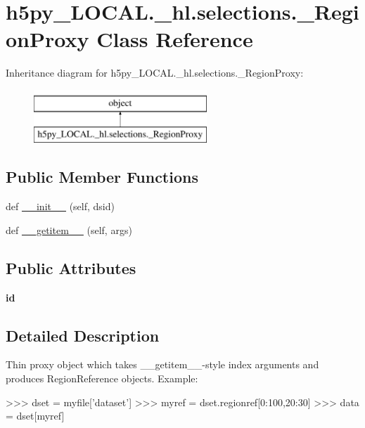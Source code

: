 \hypertarget{classh5py__LOCAL_1_1__hl_1_1selections_1_1__RegionProxy}{}\section{h5py\+\_\+\+L\+O\+C\+A\+L.\+\_\+hl.\+selections.\+\_\+\+Region\+Proxy Class Reference}
\label{classh5py__LOCAL_1_1__hl_1_1selections_1_1__RegionProxy}
Inheritance diagram for h5py\+\_\+\+L\+O\+C\+A\+L.\+\_\+hl.\+selections.\+\_\+\+Region\+Proxy\+:\begin{figure}[H]
\begin{center}
\leavevmode
\includegraphics[height=2.000000cm]{classh5py__LOCAL_1_1__hl_1_1selections_1_1__RegionProxy}
\end{center}
\end{figure}
\subsection*{Public Member Functions}
\begin{DoxyCompactItemize}
\item 
def \hyperlink{classh5py__LOCAL_1_1__hl_1_1selections_1_1__RegionProxy_a2c2d27cfe6e1822817d762e5f8d91279}{\+\_\+\+\_\+init\+\_\+\+\_\+} (self, dsid)
\item 
def \hyperlink{classh5py__LOCAL_1_1__hl_1_1selections_1_1__RegionProxy_a3ea41f12f66ca405ef99bcfec7d1c649}{\+\_\+\+\_\+getitem\+\_\+\+\_\+} (self, args)
\end{DoxyCompactItemize}
\subsection*{Public Attributes}
\begin{DoxyCompactItemize}
\item 
\mbox{\label{classh5py__LOCAL_1_1__hl_1_1selections_1_1__RegionProxy_aeb36cce25ca5956e8ae5f7b70147f7a7}} 
{\bfseries id}
\end{DoxyCompactItemize}


\subsection{Detailed Description}
\begin{DoxyVerb}    Thin proxy object which takes __getitem__-style index arguments and
    produces RegionReference objects.  Example:

    >>> dset = myfile['dataset']
    >>> myref = dset.regionref[0:100,20:30]
    >>> data = dset[myref]\end{DoxyVerb}
 

